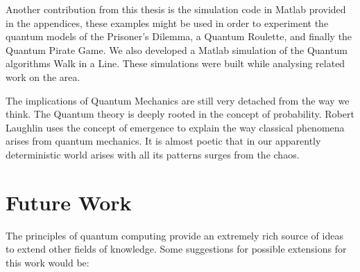 Another contribution from this thesis is the simulation code in Matlab provided in the appendices, these examples might be used in order to experiment the quantum models of the Prisoner's Dilemma, a Quantum Roulette, and finally the Quantum Pirate Game. We also developed a Matlab simulation of the Quantum algorithms Walk in a Line. These simulations were built while analysing related work on the area.

The implications of Quantum Mechanics are still very detached from the way we think. The Quantum theory is deeply rooted in the concept of probability. Robert Laughlin uses the concept of emergence to explain the way classical phenomena arises from quantum mechanics\cite{Laughlin2005}. It is almost poetic that in our apparently deterministic world arises with all its patterns surges from the chaos. 

\section{Future Work}
\label{sec:5FutureWork}

The principles of quantum computing provide an extremely rich source of ideas to extend other fields of knowledge.
Some suggestions for possible extensions for this work would be:

